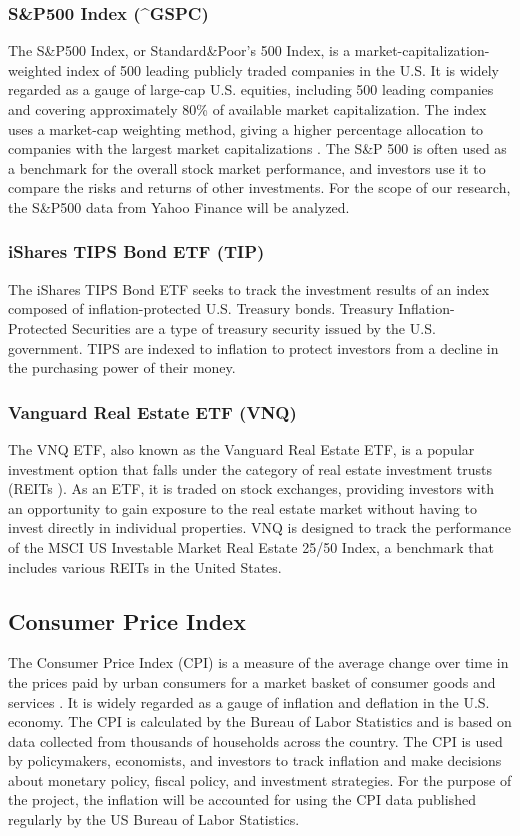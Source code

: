 \documentclass{article}
\begin{document}
\subsubsection{S\&P500 Index (\textasciicircum{}GSPC)}
The S\&P500 Index, or Standard\&Poor's 500 Index, is a market-capitalization-weighted index of 500 leading publicly traded companies in the U.S. It is widely regarded as a gauge of large-cap U.S. equities, including 500 leading companies and covering approximately 80\% of available market capitalization. The index uses a market-cap weighting method, giving a higher percentage allocation to companies with the largest market capitalizations \cite{S&P500}. The S\&P 500 is often used as a benchmark for the overall stock market performance, and investors use it to compare the risks and returns of other investments. For the scope of our research, the S\&P500 data from Yahoo Finance will be analyzed.

\subsubsection{iShares TIPS Bond ETF (TIP)}
The iShares TIPS Bond ETF seeks to track the investment results of an index composed of inflation-protected U.S. Treasury bonds. Treasury Inflation-Protected Securities \cite{investopediaTreasuryInflationProtected} are a type of treasury security issued by the U.S. government. TIPS are indexed to inflation to protect investors from a decline in the purchasing power of their money. 

\subsubsection{Vanguard Real Estate ETF (VNQ)}
The VNQ ETF, also known as the Vanguard Real Estate ETF, is a popular investment option that falls under the category of real estate investment trusts (REITs \cite{etfinsiderWhat}). As an ETF, it is traded on stock exchanges, providing investors with an opportunity to gain exposure to the real estate market without having to invest directly in individual properties. VNQ is designed to track the performance of the MSCI US Investable Market Real Estate 25/50 Index, a benchmark that includes various REITs in the United States. 

\subsection{Consumer Price Index}
The Consumer Price Index (CPI) is a measure of the average change over time in the prices paid by urban consumers for a market basket of consumer goods and services \cite{blsHomeUS}. It is widely regarded as a gauge of inflation and deflation in the U.S. economy. The CPI is calculated by the Bureau of Labor Statistics and is based on data collected from thousands of households across the country. The CPI is used by policymakers, economists, and investors to track inflation and make decisions about monetary policy, fiscal policy, and investment strategies.
For the purpose of the project, the inflation will be accounted for using the CPI data published regularly by the US Bureau of Labor Statistics.
\end{document}
